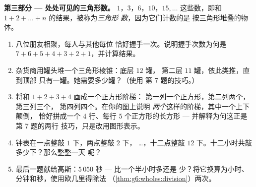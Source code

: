 \begin{problem}
\medskip
\noindent\textbf{第三部分 --- 处处可见的三角形数。}
$1$，$3$，$6$，$10$，$15, \dots$ 这些数，即和
$1 + 2 + \dots + n$ 的结果，被称为\emph{三角形
数}，因为它们计数的是
按三角形堆叠的物体。
\begin{enumerate}[resume]
  \item 八位朋友相聚，每人与其他每位
        恰好握手一次。说明握手次数为何是
        $7 + 6 + 5 + 4 + 3 + 2 + 1$，并计算结果。
  \item 杂货商用罐头堆一个三角形棱锥：底层 $12$ 罐，
        第二层 $11$ 罐，依此类推，直到顶部
        只有一罐。她需要多少罐？（使用
        第 7 题的技巧。）
  \item 将和 $1 + 2 + 3 + 4$ 画成一个正方形阶梯：
        第一列一个正方形，第二列两个，第三列三个，
        第四列四个。在你的图上说明
        \emph{两个}这样的阶梯，其中一个上下颠倒，
        恰好拼成一个 $4$ 行、每行
        $5$ 个正方形的长方形 --- 并解释为何这正是第 7 题的两行
        技巧，只是改用图形表示。
  \item 钟表在一点整敲 $1$ 下，两点整敲 $2$ 下，
        \dots，十二点整敲 $12$ 下。十二小时共敲
        多少下？那么整整一天
        呢？
  \item 最后一题献给高斯：$5\,050$ 秒 --- 比一个半小时多还是
        少？将它换算为小时、
        分钟和秒，使用欧几里得除法
        （\cref{thm:g6:wholes:division}）两次。
\end{enumerate}
\end{problem}
